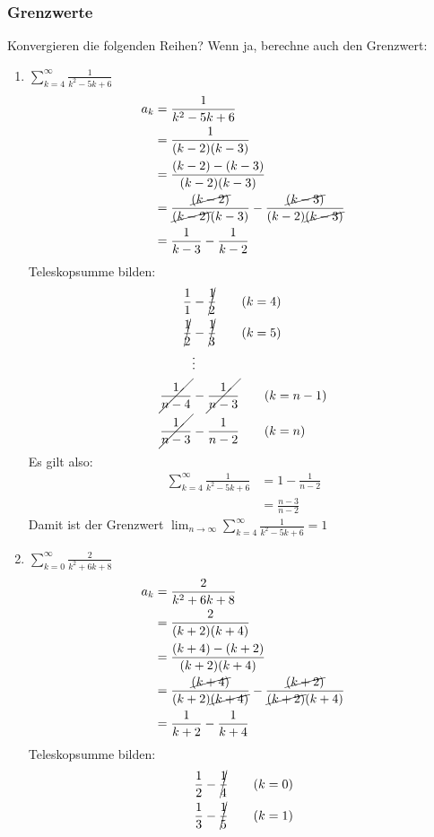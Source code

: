 \documentclass[11pt, a4paper]{article}
\begin{document}
\subsubsection{Grenzwerte}
Konvergieren die folgenden Reihen? Wenn ja, berechne auch den Grenzwert:
\begin{enumerate}
	\item $\sum_{k=4}^\infty \frac{1}{k^2-5k+6}$
		\begin{align*}
			a_k &= \frac{1}{k^2-5k+6} \\
			&= \frac{1}{(k-2)(k-3)} \\
			&= \frac{(k-2)-(k-3)}{(k-2)(k-3)} \\
			&= \frac{\cancel{(k-2)}}{\cancel{(k-2)}(k-3)} - \frac{\cancel{(k-3)}}{(k-2)\cancel{(k-3)}} \\
			&= \frac{1}{k-3} - \frac{1}{k-2}
		\end{align*}
		Teleskopsumme bilden:
		\begin{align*}
			\frac{1}{1} &- \cancel{\frac{1}{2}} \tag{$k=4$} \\
			\cancel{\frac{1}{2}} &- \cancel{\frac{1}{3}} \tag{$k=5$} \\
			& \vdots \\
			\cancel{\frac{1}{n-4}} &- \cancel{\frac{1}{n-3}} \tag{$k=n-1$} \\
			\cancel{\frac{1}{n-3}} &- \frac{1}{n-2} \tag{$k=n$}
		\end{align*}
		Es gilt also:
		\begin{align*}
			\sum_{k=4}^\infty \frac{1}{k^2-5k+6} &= 1 - \frac{1}{n-2} \\
			&= \frac{n-3}{n-2}
		\end{align*}
		Damit ist der Grenzwert $\lim_{n \rightarrow \infty} \sum_{k=4}^\infty \frac{1}{k^2-5k+6} = 1$
	\item $\sum_{k=0}^\infty \frac{2}{k^2+6k+8}$
		\begin{align*}
			a_k &= \frac{2}{k^2+6k+8} \\
			&= \frac{2}{(k+2)(k+4)} \\
			&= \frac{(k+4)-(k+2)}{(k+2)(k+4)} \\
			&= \frac{\cancel{(k+4)}}{(k+2)\cancel{(k+4)}} - \frac{\cancel{(k+2)}}{\cancel{(k+2)}(k+4)} \\
			&= \frac{1}{k+2} - \frac{1}{k+4}
		\end{align*}
		Teleskopsumme bilden:
		\begin{align*}
			\frac{1}{2} &- \cancel{\frac{1}{4}} \tag{$k=0$} \\
			\frac{1}{3} &- \cancel{\frac{1}{5}} \tag{$k=1$} \\

\end{align*}
\end{enumerate}
\end{document}
